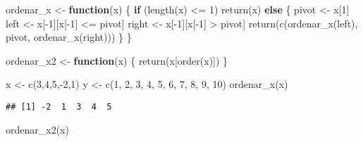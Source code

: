 \documentclass[
]{article}
\newenvironment{Shaded}{\begin{snugshade}}{\end{snugshade}}
\newcommand{\ControlFlowTok}[1]{\textcolor[rgb]{0.13,0.29,0.53}{\textbf{#1}}}
\newcommand{\DecValTok}[1]{\textcolor[rgb]{0.00,0.00,0.81}{#1}}
\newcommand{\FunctionTok}[1]{\textcolor[rgb]{0.00,0.00,0.00}{#1}}
\newcommand{\NormalTok}[1]{#1}
\newcommand{\OtherTok}[1]{\textcolor[rgb]{0.56,0.35,0.01}{#1}}
\newcommand{\SpecialCharTok}[1]{\textcolor[rgb]{0.00,0.00,0.00}{#1}}
\begin{document}
\begin{Shaded}
\begin{Highlighting}[]
\NormalTok{ordenar\_x }\OtherTok{\textless{}{-}} \ControlFlowTok{function}\NormalTok{(x) \{}
  \ControlFlowTok{if}\NormalTok{ (}\FunctionTok{length}\NormalTok{(x) }\SpecialCharTok{\textless{}=} \DecValTok{1}\NormalTok{) }\FunctionTok{return}\NormalTok{(x)}
  \ControlFlowTok{else}\NormalTok{ \{}
\NormalTok{    pivot }\OtherTok{\textless{}{-}}\NormalTok{ x[}\DecValTok{1}\NormalTok{]}
\NormalTok{    left }\OtherTok{\textless{}{-}}\NormalTok{ x[}\SpecialCharTok{{-}}\DecValTok{1}\NormalTok{][x[}\SpecialCharTok{{-}}\DecValTok{1}\NormalTok{] }\SpecialCharTok{\textless{}=}\NormalTok{ pivot]}
\NormalTok{    right }\OtherTok{\textless{}{-}}\NormalTok{ x[}\SpecialCharTok{{-}}\DecValTok{1}\NormalTok{][x[}\SpecialCharTok{{-}}\DecValTok{1}\NormalTok{] }\SpecialCharTok{\textgreater{}}\NormalTok{ pivot]}
    \FunctionTok{return}\NormalTok{(}\FunctionTok{c}\NormalTok{(}\FunctionTok{ordenar\_x}\NormalTok{(left), pivot, }\FunctionTok{ordenar\_x}\NormalTok{(right)))}
\NormalTok{  \}}
\NormalTok{\}}


\NormalTok{ordenar\_x2 }\OtherTok{\textless{}{-}} \ControlFlowTok{function}\NormalTok{(x) \{}
  \FunctionTok{return}\NormalTok{(x[}\FunctionTok{order}\NormalTok{(x)])}
\NormalTok{\}}

\NormalTok{x }\OtherTok{\textless{}{-}} \FunctionTok{c}\NormalTok{(}\DecValTok{3}\NormalTok{,}\DecValTok{4}\NormalTok{,}\DecValTok{5}\NormalTok{,}\SpecialCharTok{{-}}\DecValTok{2}\NormalTok{,}\DecValTok{1}\NormalTok{)}
\NormalTok{y }\OtherTok{\textless{}{-}} \FunctionTok{c}\NormalTok{(}\DecValTok{1}\NormalTok{, }\DecValTok{2}\NormalTok{, }\DecValTok{3}\NormalTok{, }\DecValTok{4}\NormalTok{, }\DecValTok{5}\NormalTok{, }\DecValTok{6}\NormalTok{, }\DecValTok{7}\NormalTok{, }\DecValTok{8}\NormalTok{, }\DecValTok{9}\NormalTok{, }\DecValTok{10}\NormalTok{)}
\FunctionTok{ordenar\_x}\NormalTok{(x)}
\end{Highlighting}
\end{Shaded}

\begin{verbatim}
## [1] -2  1  3  4  5
\end{verbatim}

\begin{Shaded}
\begin{Highlighting}[]
\FunctionTok{ordenar\_x2}\NormalTok{(x)}
\end{Highlighting}
\end{Shaded}
\end{document}
